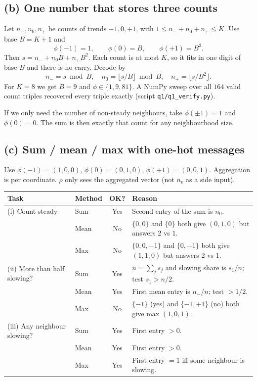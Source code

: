 \documentclass[11pt,a4paper]{article}
\begin{document}
\subsection*{(b) One number that stores three counts}
Let $n_{-},n_0,n_{+}$ be counts of trends $-1,0,+1$, with $1\le n_{-}+n_0+n_{+}\le K$. Use base $B=K+1$ and
\[
\phi(-1)=1,\qquad \phi(0)=B,\qquad \phi(+1)=B^2.
\]
Then $s=n_{-}+n_0 B+n_{+}B^2$. Each count is at most $K$, so it fits in one digit of base $B$ and there is no carry. Decode by
\[
n_{-}=s\bmod B,\quad
n_0=\big\lfloor s/B\big\rfloor\bmod B,\quad
n_{+}=\big\lfloor s/B^2\big\rfloor.
\]
For $K=8$ we get $B=9$ and $\phi\in\{1,9,81\}$. A NumPy sweep over all $164$ valid count triples recovered every triple exactly (script \texttt{q1/q1\_verify.py}).

If we only need the number of non-steady neighbours, take $\phi(\pm 1)=1$ and $\phi(0)=0$. The sum is then exactly that count for any neighbourhood size.

\subsection*{(c) Sum / mean / max with one-hot messages}
Use $\phi(-1)=(1,0,0)$, $\phi(0)=(0,1,0)$, $\phi(+1)=(0,0,1)$. Aggregation is per coordinate. $\rho$ only sees the aggregated vector (not $n_v$ as a side input).

\begin{table}[H]
\centering
\small
{}
\begin{tabular}{>{\raggedright\arraybackslash}p{3.8cm} l c >{\raggedright\arraybackslash}p{6.6cm}}
\rowcolor{tablehead}
\textbf{Task} & \textbf{Method} & \textbf{OK?} & \textbf{Reason}\\
\midrule
(i) Count steady
& Sum & Yes & Second entry of the sum is $n_0$.\\
& Mean & No & $\{0,0\}$ and $\{0\}$ both give $(0,1,0)$ but answers $2$ vs $1$.\\
& Max & No & $\{0,0,-1\}$ and $\{0,-1\}$ both give $(1,1,0)$ but answers $2$ vs $1$.\\
\midrule
(ii) More than half slowing?
& Sum & Yes & $n=\sum_j s_j$ and slowing share is $s_1/n$; test $s_1>n/2$.\\
& Mean & Yes & First mean entry is $n_{-}/n$; test $>1/2$.\\
& Max & No & $\{-1\}$ (yes) and $\{-1,+1\}$ (no) both give max $(1,0,1)$.\\
\midrule
(iii) Any neighbour slowing?
& Sum & Yes & First entry $>0$.\\
& Mean & Yes & First entry $>0$.\\
& Max & Yes & First entry $=1$ iff some neighbour is slowing.\\
\end{tabular}
\end{table}
\end{document}

